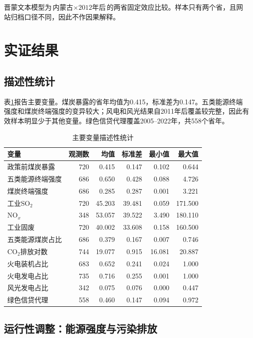 \documentclass[UTF8,12pt]{ctexart}
\begin{document}
晋蒙文本模型为$\text{内蒙古}\times\text{2012年后}$的两省固定效应比较。样本只有两个省，且网站归档口径不同，因此不作因果解释。

\section{实证结果}

\subsection{描述性统计}

表\ref{tab:desc}报告主要变量。煤炭暴露的省年均值为0.415，标准差为0.147。五类能源终端强度和煤炭终端强度的变异较大；风电和风光结果自2011年后覆盖较完整，因此有效样本明显少于其他变量。绿色信贷代理覆盖2005--2022年，共558个省年。

\begin{table}[H]
\centering
\caption{主要变量描述性统计}
\label{tab:desc}
\begin{tabular}{lrrrrr}
\toprule
变量 & 观测数 & 均值 & 标准差 & 最小值 & 最大值 \\
\midrule
政策前煤炭暴露 & 720 & 0.415 & 0.147 & 0.102 & 0.644 \\
五类能源终端强度 & 686 & 0.650 & 0.428 & 0.088 & 4.726 \\
煤炭终端强度 & 686 & 0.285 & 0.287 & 0.001 & 3.221 \\
工业SO$_2$ & 720 & 45.203 & 39.481 & 0.059 & 171.500 \\
NO$_x$ & 348 & 53.057 & 39.522 & 3.490 & 180.110 \\
工业固废 & 720 & 40.002 & 33.608 & 0.158 & 160.500 \\
五类能源煤炭占比 & 686 & 0.379 & 0.167 & 0.007 & 0.746 \\
CO$_2$排放对数 & 744 & 19.077 & 0.915 & 16.081 & 20.887 \\
火电装机占比 & 683 & 0.652 & 0.241 & 0.024 & 1.000 \\
火电发电占比 & 735 & 0.716 & 0.255 & 0.001 & 1.000 \\
风光发电占比 & 342 & 0.075 & 0.076 & 0.000 & 0.447 \\
绿色信贷代理 & 558 & 0.460 & 0.147 & 0.094 & 0.972 \\
\bottomrule
\end{tabular}
\end{table}

\subsection{运行性调整：能源强度与污染排放}
\end{document}

